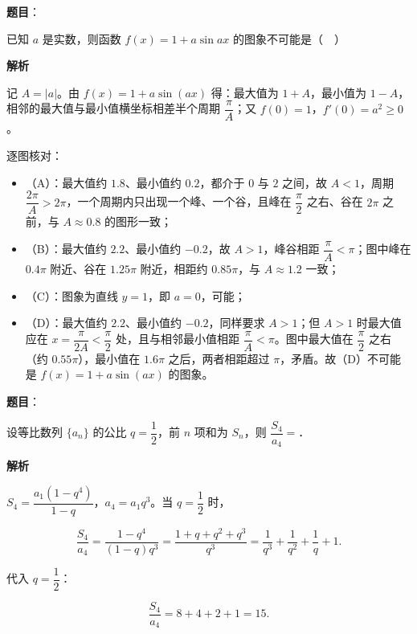 \begin{answer}

\textbf{题目}：

已知 $a$ 是实数，则函数 $f(x)=1+a\sin ax$ 的图象不可能是（　）
\nopagebreak[4]
\begin{center}\end{center}
\nopagebreak[4]
\textbf{解析}

记 $A=|a|$。由 $f(x)=1+a\sin(ax)$ 得：最大值为 $1+A$，最小值为 $1-A$，相邻的最大值与最小值横坐标相差半个周期 $\dfrac{\pi}{A}$；又 $f(0)=1$，$f'(0)=a^2\geqslant0$。

逐图核对：

\begin{itemize}
\item （A）：最大值约 $1.8$、最小值约 $0.2$，都介于 $0$ 与 $2$ 之间，故 $A<1$，周期 $\dfrac{2\pi}{A}>2\pi$，一个周期内只出现一个峰、一个谷，且峰在 $\dfrac\pi2$ 之右、谷在 $2\pi$ 之前，与 $A\approx0.8$ 的图形一致；
\item （B）：最大值约 $2.2$、最小值约 $-0.2$，故 $A>1$，峰谷相距 $\dfrac{\pi}{A}<\pi$；图中峰在 $0.4\pi$ 附近、谷在 $1.25\pi$ 附近，相距约 $0.85\pi$，与 $A\approx1.2$ 一致；
\item （C）：图象为直线 $y=1$，即 $a=0$，可能；
\item （D）：最大值约 $2.2$、最小值约 $-0.2$，同样要求 $A>1$；但 $A>1$ 时最大值应在 $x=\dfrac{\pi}{2A}<\dfrac\pi2$ 处，且与相邻最小值相距 $\dfrac{\pi}{A}<\pi$。图中最大值在 $\dfrac\pi2$ 之右（约 $0.55\pi$），最小值在 $1.6\pi$ 之后，两者相距超过 $\pi$，矛盾。故（D）不可能是 $f(x)=1+a\sin(ax)$ 的图象。
\end{itemize}


\end{answer}
\begin{answer}

\textbf{题目}：

设等比数列 $\{a_n\}$ 的公比 $q=\dfrac12$，前 $n$ 项和为 $S_n$，则 $\dfrac{S_4}{a_4}=$\gkblank{}．

\textbf{解析}

$S_4=\dfrac{a_1(1-q^4)}{1-q}$，$a_4=a_1q^3$。当 $q=\dfrac12$ 时，

\nopagebreak[4]
\[\frac{S_4}{a_4}
=\frac{1-q^4}{(1-q)q^3}
=\frac{1+q+q^2+q^3}{q^3}
=\frac{1}{q^3}+\frac1{q^2}+\frac1q+1.\]

代入 $q=\dfrac12$：

\nopagebreak[4]
\[\frac{S_4}{a_4}=8+4+2+1=15.\]


\end{answer}
